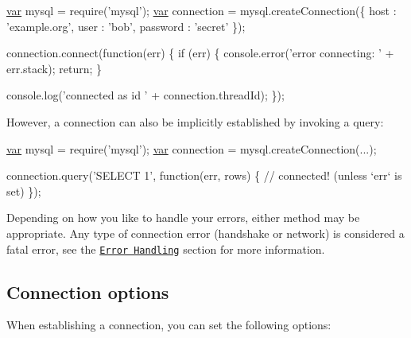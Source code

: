 \begin{DoxyCode}
\hyperlink{018__def_8c_a335628f2e9085305224b4f9cc6e95ed5}{var} mysql      = require(\textcolor{stringliteral}{'mysql'});
\hyperlink{018__def_8c_a335628f2e9085305224b4f9cc6e95ed5}{var} connection = mysql.createConnection(\{
  host     : \textcolor{stringliteral}{'example.org'},
  user     : \textcolor{stringliteral}{'bob'},
  password : \textcolor{stringliteral}{'secret'}
\});

connection.connect(\textcolor{keyword}{function}(err) \{
  \textcolor{keywordflow}{if} (err) \{
    console.error(\textcolor{stringliteral}{'error connecting: '} + err.stack);
    \textcolor{keywordflow}{return};
  \}

  console.log(\textcolor{stringliteral}{'connected as id '} + connection.threadId);
\});
\end{DoxyCode}


However, a connection can also be implicitly established by invoking a query\+:


\begin{DoxyCode}
\hyperlink{018__def_8c_a335628f2e9085305224b4f9cc6e95ed5}{var} mysql      = require(\textcolor{stringliteral}{'mysql'});
\hyperlink{018__def_8c_a335628f2e9085305224b4f9cc6e95ed5}{var} connection = mysql.createConnection(...);

connection.query(\textcolor{stringliteral}{'SELECT 1'}, \textcolor{keyword}{function}(err, rows) \{
  \textcolor{comment}{// connected! (unless `err` is set)}
\});
\end{DoxyCode}


Depending on how you like to handle your errors, either method may be appropriate. Any type of connection error (handshake or network) is considered a fatal error, see the \href{#error-handling}{\tt Error Handling} section for more information.

\subsection*{Connection options}

When establishing a connection, you can set the following options\+:



